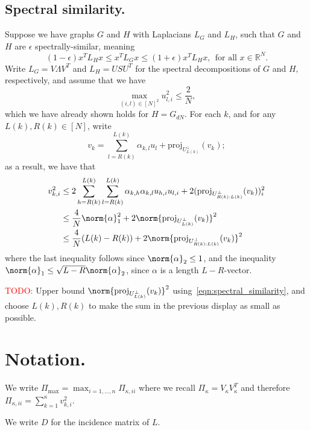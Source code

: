 \documentclass{article}
\newcommand{\Reals}{\mathbb{R}}
\newcommand{\1}{\mathbf{1}}
\theoremstyle{alden}
\theoremstyle{aldenthm}
\theoremstyle{definition}
\theoremstyle{remark}
\begin{document}
\subsection{Spectral similarity.}
Suppose we have graphs $G$ and $H$ with Laplacians $L_G$ and $L_H$, such that $G$ and $H$ are $\epsilon$ spectrally-similar, meaning
\begin{equation}
\label{eqn:spectral_similarity}
(1 - \epsilon) x^T L_H x \leq x^T L_G x \leq (1 + \epsilon) x^T L_H x,~~ \textrm{for all $x \in \Reals^N$.}
\end{equation}
Write $L_G = V \Lambda V^T$ and $L_H = U S U^T$ for the spectral decompositions of $G$ and $H$, respectively, and assume that we have
\begin{equation*}
\max_{(i,l) \in [N]^2} u_{l,i}^2 \leq \frac{2}{N},
\end{equation*}
which we have already shown holds for $H = G_{dN}$. For each $k$, and for any $L(k), R(k) \in [N]$, write
\begin{equation*}
v_{k} = \sum_{l = R(k)}^{L(k)}\alpha_{k,l} u_l +  \textrm{proj}_{U_{L(k)}^{\perp}}(v_k);
\end{equation*}
as a result, we have that
\begin{align*}
v_{k,i}^2 & \leq 2\sum_{h = R(k)}^{L(k)} \sum_{l = R(k)}^{L(k)}\alpha_{k,h}\alpha_{k,l} u_{h,i} u_{l,i} + 2(\textrm{proj}_{U_{R(k):L(k)}^{\perp}}(v_k))_i^2 \\
& \leq \frac{4}{N} \norm{\alpha}_1^2 + 2\norm{ \textrm{proj}_{U_{L(k)}^{\perp}}(v_k)}^2 \\
& \leq \frac{4}{N} (L(k) - R(k)) + 2\norm{ \textrm{proj}_{U_{R(k):L(k)}^{\perp}}(v_k)}^2
\end{align*}
where the last inequality follows since $\norm{\alpha}_2 \leq 1$, and the inequality $\norm{\alpha}_1 \leq \sqrt{L - R} \norm{\alpha}_2$, since $\alpha$ is a length $L - R$-vector. 

\textcolor{red}{TODO:} Upper bound $\norm{ \textrm{proj}_{U_{L(k)}^{\perp}}(v_k)}^2$ using~\eqref{eqn:spectral_similarity}, and choose $L(k),R(k)$ to make the sum in the previous display as small as possible.
\section{Notation.}

We write $\Pi_{\max} = \max_{i = 1,\ldots,n} \Pi_{\kappa,ii}$ where we recall $\Pi_{\kappa} = V_{\kappa} V_{\kappa}^T$ and therefore $\Pi_{\kappa,ii} = \sum_{k = 1}^{\kappa} v_{k,i}^2$. 

We write $D$ for the incidence matrix of $L$.
\end{document}
